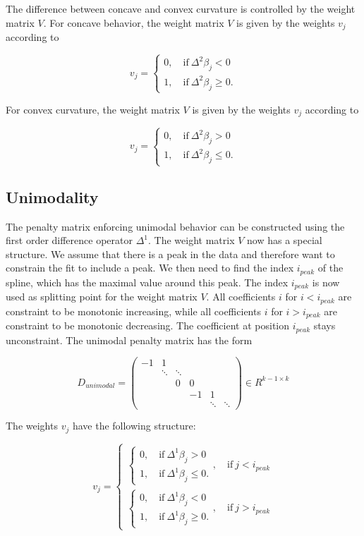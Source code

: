 \documentclass[10pt,a4paper]{article}
\begin{document}
	The difference between concave and convex curvature is controlled by the weight matrix $V$. For concave behavior, the weight matrix $V$ is given by the weights $v_j$ according to
	
	$$v_j = \begin{cases} 0, \quad \text{if} \ \Delta^2\beta_j < 0 \\ 1, \quad \text{if} \ \Delta^2\beta_j \ge 0. \end{cases}$$
	
	For convex curvature, the weight matrix $V$ is given by the weights $v_j$ according to
	
	$$v_j = \begin{cases} 0, \quad \text{if} \ \Delta^2\beta_j > 0 \\ 1, \quad \text{if} \ \Delta^2\beta_j \le 0. \end{cases}$$
	
	\subsection{Unimodality}
	
	The penalty matrix enforcing unimodal behavior can be constructed using the first order difference operator $\Delta^1$. The weight matrix $V$ now has a special structure. We assume that there is a peak in the data and therefore want to constrain the fit to include a peak. We then need to find the index $i_{peak}$ of the spline, which has the maximal value around this  peak. The index $i_{peak}$ is now used as splitting point for the weight matrix $V$. All coefficients $i$ for $i < i_{peak}$ are constraint to be monotonic increasing, while all coefficients $i$ for $i > i_{peak}$ are constraint to be monotonic decreasing. The coefficient at position $i_{peak}$ stays unconstraint.  The unimodal penalty matrix has the form 
	
	$$D_{unimodal} = \begin{pmatrix} -1 & 1 \\ 
									    & \ddots & \ddots  \\
									    & & 0 & 0 \\ 
									    & & & -1 & 1 \\
									    & & & &  \ddots & \ddots 
					 \end{pmatrix} \in R^{k-1 \times k}$$
	
	The weights $v_j$ have the following structure:
	
	$$v_j = \begin{cases} \begin{cases} 0, \quad \text{if} \ \Delta^1\beta_j > 0 \\ 
	1, \quad \text{if} \ \Delta^1\beta_j \le 0.\end{cases}, \quad \text{if} \ j < i_{peak} \\ \begin{cases} 0, \quad \text{if} \ \Delta^1\beta_j < 0 \\ 
	1, \quad \text{if} \ \Delta^1\beta_j \ge 0.\end{cases}  , \quad \text{if} \ j > i_ {peak}  \end{cases}$$
	
\end{document}
